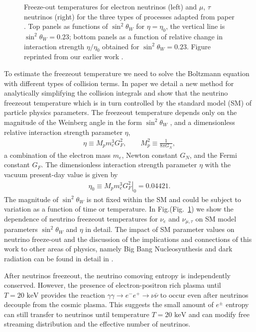 \documentclass[universe,article,submit,moreauthors,pdftex,a4paper]{Definitions/mdpi}
\newcommand{\keV}{\text{ keV}}
\newcommand*{\rf}[1]{Fig.~{\ref{#1}}}
\begin{document}
\begin{figure}[ht]
\caption{Freeze-out temperatures for electron neutrinos (left) and $\mu$, $\tau$ neutrinos (right) for the three types of processes adapted from paper \cite{Birrell:2014uka}. Top panels as functions of $\sin^2\theta_W$ for $\eta=\eta_0$, the vertical line is $\sin^2\theta_W=0.23$; bottom panels  as a function  of relative change in interaction strength $\eta/\eta_0$ obtained  for $\sin^2\theta_W=0.23$. Figure reprinted from our earlier work \cite{Birrell:2014uka}.}
\label{fig:freezeoutT}%
 \end{figure}

 To estimate the freezeout temperature we need to solve the Boltzmann equation with different types of collision terms. In paper \cite{Birrell:2014uka} we detail a new method for analytically simplifying the collision integrals and show that the neutrino freezeout temperature which is in turn controlled by the standard model (SM) of particle physics  parameters. The freezeout temperature depends only on the magnitude of the Weinberg angle in the form $\sin^2\theta_W$ , and a dimensionless relative interaction strength parameter $\eta$,
\begin{align}
\eta\equiv M_p m_e^3 G_F^2, \qquad M_p^2\equiv \frac{1}{8\pi G_N}, \end{align}
a combination of  the electron mass $m_e$, Newton constant $G_N$, and the Fermi constant $G_F$. The dimensionless interaction strength parameter $\eta$ with the vacuum present-day value is given by
\begin{align}
\eta_0\equiv \left.M_p m_e^3 G_F^2\right|_0  = 0.04421 .
\end{align}
The magnitude of  $\sin^2\theta_W$ is not fixed within the SM and  could be subject to variation as a function of time or temperature. In Fig.(\rf{fig:freezeoutT}) we show the dependence of neutrino freezeout temperatures for $\nu_e$ and $\nu_{\mu,\tau}$ on SM model parameters  $\sin^2\theta_W$ and $\eta$ in detail. The impact of SM parameter values on neutrino freeze-out and the discussion of the implications and connections of this work to other areas of physics, namely Big Bang Nucleosynthesis and dark radiation can be found in detail in \cite{Dreiner:2011fp,Boehm:2012gr,Blennow:2012de,Birrell:2014uka}.

 After neutrinos freezeout, the neutrino comoving entropy is independently conserved. However, the presence of electron-positron rich plasma until $T=20\keV$ provides the reaction $\gamma\gamma\to e^-e^+\to\nu\bar{\nu}$ to occur even after neutrinos decouple from the cosmic plasma. This suggests the small amount of $e^\pm$ entropy can still transfer to neutrinos until temperature $T=20\keV$ and can modify free streaming distribution and the effective number of neutrinos.
\end{document}
